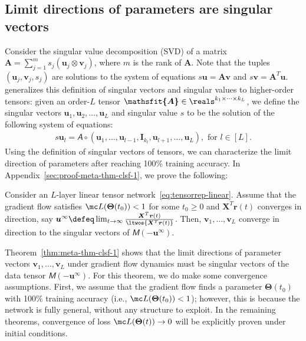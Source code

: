 \documentclass{article} %
\def\vr{{\bm{r}}}
\def\vu{{\bm{u}}}
\def\vv{{\bm{v}}}
\def\mA{{\bm{A}}}
\def\mI{{\bm{I}}}
\def\mX{{\bm{X}}}
\newcommand{\tens}[1]{\bm{\mathsfit{#1}}}
\def\tA{{\tens{A}}}
\def\tM{{\tens{M}}}
\newcommand{\bTheta}{\bm{\Theta}}
\begin{document}
\subsection{Limit directions of parameters are singular vectors}
\label{sec:meta-thms-clsf-1}
Consider the singular value decomposition (SVD) of a matrix $\mA = \sum_{j=1}^m s_j (\vu_j \otimes \vv_j)$, where $m$ is the rank of $\mA$. Note that the tuples $(\vu_j, \vv_j, s_j)$ are solutions to the system of equations
$s \vu = \mA \vv$ and $s \vv = \mA^T \vu$.
\citet{lim2005singular} generalizes this definition of singular vectors and singular values to higher-order tensors: given an order-$L$ tensor $\tA \in \reals^{k_1 \times \cdots \times k_L}$, we define the singular vectors $\vu_1, \vu_2, \dots, \vu_L$ and singular value $s$ to be the solution of the following system of equations:
\begin{align}
\label{eq:tensorsingvec}
    s \vu_l = \tA \circ (\vu_1, \dots, \vu_{l-1}, \mI_{k_l}, \vu_{l+1}, \dots, \vu_L), \text{ for } l \in [L].
\end{align}
Using the definition of singular vectors of tensors, we can characterize the limit direction of parameters after reaching 100\% training accuracy. In Appendix~\ref{sec:proof-meta-thm-clsf-1}, we prove the following:
\begin{theorem}
\label{thm:meta-thm-clsf-1}
Consider an $L$-layer linear tensor network~\eqref{eq:tensorrep-linear}. 
Assume that the gradient flow satisfies $\mc L(\bTheta(t_0)) < 1$ for some $t_0 \geq 0$ and $\mX^T \vr(t)$ converges in direction, say $\vu^\infty \defeq \lim_{t\to\infty} \frac{\mX^T \vr(t)}{\ltwos{\mX^T\vr(t)}}$.
Then, $\vv_1, \dots, \vv_L$ converge in direction to the singular vectors of $\tM(-\vu^\infty)$.
\end{theorem}
Theorem~\ref{thm:meta-thm-clsf-1} shows that the limit directions of parameter vectors $\vv_1, \dots, \vv_L$ under gradient flow dynamics must be singular vectors of the data tensor $\tM(-\vu^\infty)$.
For this theorem, we do make some convergence assumptions. First, we assume that the gradient flow finds a parameter $\bTheta(t_0)$ with 100\% training accuracy (i.e., $\mc L(\bTheta(t_0)) < 1$); however, this is because the network is fully general, without any structure to exploit. In the remaining theorems, convergence of loss $\mc L(\bTheta(t)) \to 0$ will be explicitly proven under initial conditions.
\end{document}
